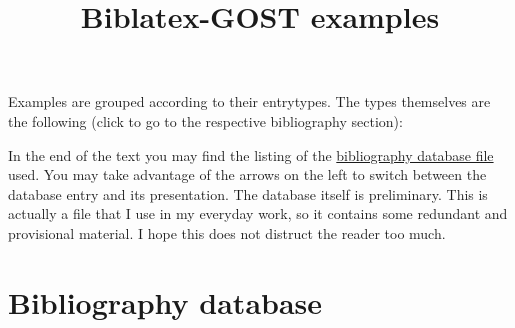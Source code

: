 \documentclass[a4paper,10pt]{article}
\title{Biblatex-GOST examples}
\date{}
\begin{document}
\maketitle
Examples are grouped according to their entrytypes. The types themselves are the following 
(click to go to the respective bibliography section):
\renewcommand*{\do}[1]{\hyperref[#1]{@#1}\\}
\begin{multicols}{5}
\noindent%
\end{multicols}

In the end of the text you may find the listing of the 
\hyperref[bibfile]{bibliography database file} used. 
You may take advantage of 
the arrows on the left to switch between the database entry and its presentation.
The database itself is preliminary. This is actually a file that I use in my everyday work, 
so it contains some redundant and provisional material. I hope this does not distruct
the reader too much.  

\nocite{*}

\renewcommand*{\do}[1]{\section{@#1\label{#1}}\printbibliography[type=#1]}

\section{Bibliography database\label{bibfile}}
{\small 

}
\end{document}
